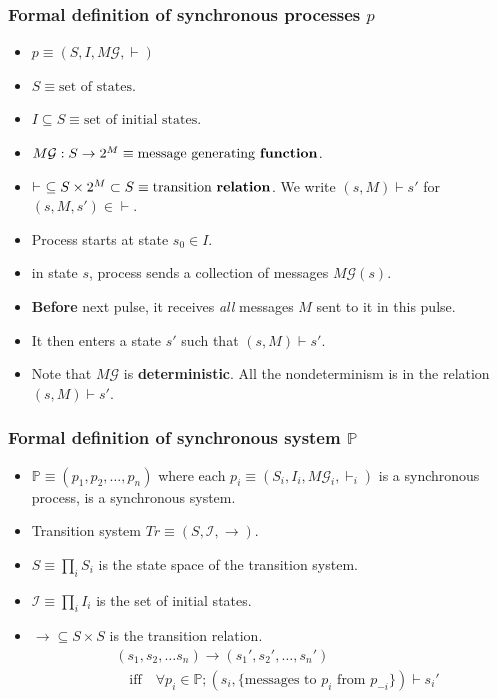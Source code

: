 \documentclass{beamer}
\begin{document}
\begin{frame}
    \frametitle{Formal definition of synchronous processes $p$}
    \begin{itemize}
        \item $p \equiv (S, I, M\mathcal G, \vdash)$ \pause
        \item $S \equiv \text{set of states}$. \pause
        \item $I \subseteq S \equiv \text{set of initial states}$. \pause
        \item $M\mathcal G : S \rightarrow 2^M \equiv \text{message generating \textbf{function}}$. \pause
        \item $\vdash ~\subseteq S \times 2^M \subset S \equiv \text{transition \textbf{relation}}$. We write 
            $(s, M) \vdash s'$ for $(s, M, s') \in \vdash$.  \pause
        \item Process starts at state $s_0 \in I$.  
        \pause
        \item in state $s$, process sends a collection of messages $M\mathcal G(s)$.
        \pause
        \item \textbf{Before} next pulse, it receives \textit{all} messages $M$ sent to it in this pulse.
        \pause
        \item It then enters a state $s'$ such that $(s, M) \vdash s'$.
        \pause
        \item Note that $M\mathcal G$ is \textbf{deterministic}.
                All the nondeterminism is in the relation $(s, M) \vdash s'$.
    \end{itemize}
\end{frame}

\begin{frame}
    \frametitle{Formal definition of synchronous system $\mathbb P$}
    \begin{itemize}
        \item $\mathbb P \equiv (p_1, p_2, \dots, p_n)$ where each $p_i \equiv (S_i, I_i, M\mathcal G_i, \vdash_i)$
            is a synchronous process, is a synchronous system. \pause
        \item Transition system $Tr \equiv (S, \mathcal I, \rightarrow)$. \pause
        \item $S \equiv \prod_i S_i$ is the state space of the transition system. \pause
        \item $\mathcal I \equiv \prod_i I_i$ is the set of initial states. \pause
        \item $\rightarrow \subseteq S \times S$ is the transition relation.
            \begin{align*}
            &(s_1, s_2, \dots s_n) \rightarrow (s_1', s_2', \dots, s_n')\\
            &\quad \text{iff} \quad\forall p_i \in \mathbb P; (s_i, \{ \text{messages to $p_i$ from $p_{-i}$} \}) \vdash s_i'
        \end{align*}
            
    \end{itemize}
\end{frame}

\begin{frame}
\end{frame}
\end{document}
